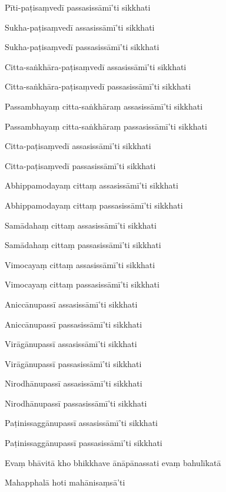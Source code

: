 Pīti-paṭisaṃvedī passasissāmī'ti sikkhati

Sukha-paṭisaṃvedī assasissāmī'ti sikkhati

Sukha-paṭisaṃvedī passasissāmī'ti sikkhati

Citta-saṅkhāra-paṭisaṃvedī assasissāmī'ti sikkhati

Citta-saṅkhāra-paṭisaṃvedī passasissāmī'ti sikkhati

Passambhayaṃ citta-saṅkhāraṃ assasissāmī'ti sikkhati

Passambhayaṃ citta-saṅkhāraṃ passasissāmī'ti sikkhati

Citta-paṭisaṃvedī assasissāmī'ti sikkhati

Citta-paṭisaṃvedī passasissāmī'ti sikkhati

Abhippamodayaṃ cittaṃ assasissāmī'ti sikkhati

Abhippamodayaṃ cittaṃ passasissāmī'ti sikkhati

Samādahaṃ cittaṃ assasissāmī'ti sikkhati

Samādahaṃ cittaṃ passasissāmī'ti sikkhati

Vimocayaṃ cittaṃ assasissāmī'ti sikkhati

Vimocayaṃ cittaṃ passasissāmī'ti sikkhati

Aniccānupassī assasissāmī'ti sikkhati

Aniccānupassī passasissāmī'ti sikkhati

Virāgānupassī assasissāmī'ti sikkhati

Virāgānupassī passasissāmī'ti sikkhati

Nirodhānupassī assasissāmī'ti sikkhati

Nirodhānupassī passasissāmī'ti sikkhati

Paṭinissaggānupassī assasissāmī'ti sikkhati

Paṭinissaggānupassī passasissāmī'ti sikkhati

Evaṃ bhāvitā kho bhikkhave ānāpānassati evaṃ bahulīkatā

Mahapphalā hoti mahānisaṃsā'ti

